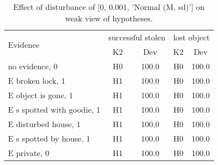 \begin{table}\begin{tabular}{l|cc|cc}\toprule\multirow{2}{*}{Evidence} & \multicolumn{2}{c}{successful stolen}& \multicolumn{2}{c}{lost object}\\& {K2} & {Dev}& {K2} & {Dev}\\\midrule
no evidence, 0 & H0&100.0&H0&100.0\\E broken lock, 1 & H1&100.0&H0&100.0\\E object is gone, 1 & H1&100.0&H0&100.0\\E s spotted with goodie, 1 & H1&100.0&H0&100.0\\E disturbed house, 1 & H1&100.0&H0&100.0\\E s spotted by house, 1 & H1&100.0&H0&100.0\\E private, 0 & H1&100.0&H0&100.0\\\bottomrule\end{tabular}\caption{Effect of disturbance of [0, 0.001, 'Normal (M, sd)'] on weak view of hypotheses.}\end{table}